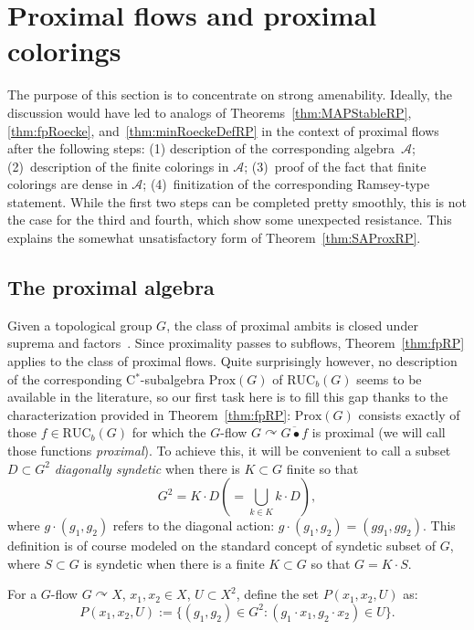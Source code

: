 \documentclass[11pt]{article}
\theoremstyle{definition}
\numberwithin{equation}{section}
\numberwithin{figure}{section}
\numberwithin{table}{section}
\newcommand{\A}{\mathcal A}
\newcommand{\actson}{\curvearrowright}
\newcommand{\RUCB}{\mathrm{RUC}_{b}}
\begin{document}
\section{Proximal flows and proximal colorings}
\label{section:proximal}

The purpose of this section is to concentrate on strong amenability. Ideally, the discussion would have led to analogs of Theorems~\ref{thm:MAPStableRP}, \ref{thm:fpRoecke}, and~\ref{thm:minRoeckeDefRP} in the context of proximal flows after the following steps: (1) description of the corresponding algebra~$\A$; (2)~description of the finite colorings in $\A$; (3)~proof of the fact that finite colorings are dense in $\A$; (4)~finitization of the corresponding Ramsey-type statement. While the first two steps can be completed pretty smoothly, this is not the case for the third and fourth, which show some unexpected resistance. This explains the somewhat unsatisfactory form of Theorem~\ref{thm:SAProxRP}.

\subsection{The proximal algebra}

Given a topological group $G$, the class of proximal ambits is closed under suprema and factors~\cite[Chapter~IV, Section~5.30]{dV}. Since proximality passes to subflows, Theorem~\ref{thm:fpRP} applies to the class of proximal flows. Quite surprisingly however, no description of the corresponding C$^{*}$-subalgebra $\mathrm{Prox}(G)$ of $\RUCB(G)$ seems to be available in the literature, so our first task here is to fill this gap thanks to the characterization provided in Theorem~\ref{thm:fpRP}: $\mathrm{Prox}(G)$ consists exactly of those $f\in \RUCB(G)$ for which the $G$-flow $G\actson\overline{G\bullet f}$ is proximal (we will call those functions \emph{proximal}). To achieve this, it will be convenient to call a subset $D\subset G^{2}$ \emph{diagonally syndetic} when there is $K\subset G$ finite so that
\[
G^{2}=K\cdot D \left(=\bigcup_{k\in K}k\cdot D\right)\!,
\]
where $g\cdot(g_{1},g_{2})$ refers to the diagonal action: $g\cdot(g_{1},g_{2})=(gg_{1}, gg_{2})$. This definition is of course modeled on the standard concept of syndetic subset of $G$, where $S\subset G$ is syndetic when there is a finite $K\subset G$ so that $G=K\cdot S$.


For a $G$-flow $G\actson X$, $x_{1}, x_{2}\in X$, $U\subset X^{2}$, define the set $P(x_{1},x_{2},U)$ as:
\[
P(x_{1}, x_{2},U):=\{ (g_{1}, g_{2})\in G^{2}: (g_{1}\cdot x_{1}, g_{2}\cdot x_{2})\in U\}.
\]
\end{document}
